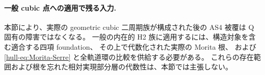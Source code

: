 \paragraph{一般 cubic 点への適用で残る入力.}
本節により、実際の geometric cubic 二周期族が構成された後の AS4 被覆は
Q 固有の障害ではなくなる。
一般の内在的 H2 族に適用するには、構造対象を含む適合する四項 foundation、
その上で代数化された実際の Morita 根、
および \eqref{hull-eq:Morita-Serre} と全軌道環の比較を供給する必要がある。
これらの存在範囲および根を忘れた相対実現部分層の代数性は、本節では主張しない。

